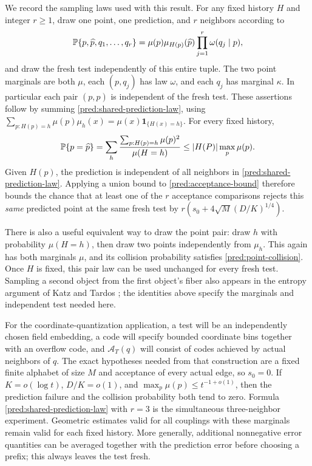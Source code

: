 We record the sampling laws used with this result.  For any fixed history
\(H\) and integer \(r\ge1\), draw one point, one prediction, and \(r\)
neighbors according to
\begin{equation}\label{pred:shared-prediction-law}
 \mathbb P\{p,\widehat p,q_1,\ldots,q_r\}
 =\mu(p)\mu_{H(p)}(\widehat p)
             \prod_{j=1}^r\omega(q_j\mid p),
\end{equation}
and draw the fresh test independently of this entire tuple.  The two point
marginals are both \(\mu\), each \((p,q_j)\) has law \(\omega\), and each
\(q_j\) has marginal \(\kappa\).  In particular each pair
\((p,\widehat p)\) is independent of the fresh test.  These assertions follow by summing
\eqref{pred:shared-prediction-law}, using
\(\sum_{p:H(p)=h}\mu(p)\mu_h(x)=\mu(x)\mathbf1_{\{H(x)=h\}}\).
For every fixed history,
\begin{equation}\label{pred:point-collision}
 \mathbb P\{p=\widehat p\}
 =\sum_h\frac{\sum_{p:H(p)=h}\mu(p)^2}{\mu(H=h)}
 \le\lvert H(P)\rvert\max_p\mu(p).
\end{equation}
Given \(H(p)\), the prediction is independent of all neighbors in
\eqref{pred:shared-prediction-law}.  Applying a union bound to
\eqref{pred:acceptance-bound} therefore bounds the chance that at least one
of the \(r\) acceptance comparisons rejects this \emph{same} predicted point
at the same fresh test by
\(r(s_0+4\sqrt M(D/K)^{1/4})\).

There is also a useful equivalent way to draw the point pair: draw
\(h\) with probability \(\mu(H=h)\), then draw two points independently
from \(\mu_h\).  This again has both marginals \(\mu\), and its collision
probability satisfies \eqref{pred:point-collision}.  Once \(H\) is fixed,
this pair law can be used unchanged for every fresh test. Sampling a second
object from the first object's fiber also appears in the entropy argument
of Katz and Tardos \cite[Section~2, proof of Lemma~1]{KatzTardos}; the
identities above specify the marginals and independent test needed here.

For the coordinate-quantization application, a test will be an independently
chosen field embedding, a code will specify bounded coordinate bins together
with an overflow code, and \(\mathcal A_T(q)\) will consist of codes achieved
by actual neighbors of \(q\).  The exact hypotheses needed from that
construction are a fixed finite alphabet of size \(M\) and acceptance of
every actual edge, so \(s_0=0\).  If \(K=o(\log t)\),
\(D/K=o(1)\), and \(\max_p\mu(p)\le t^{-1+o(1)}\), then the prediction
failure and the collision probability both tend to zero.  Formula
\eqref{pred:shared-prediction-law} with \(r=3\) is the simultaneous
three-neighbor experiment.  Geometric estimates valid for all couplings with
these marginals remain valid for each fixed history.  More generally,
additional nonnegative error quantities can be averaged together with the
prediction error before choosing a prefix; this always leaves the test fresh.

